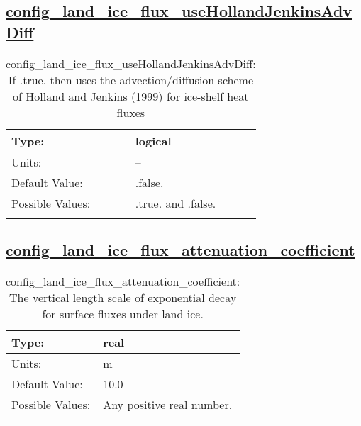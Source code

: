 \subsection[config\_land\_ice\_flux\_useHollandJenkinsAdvDiff]{\hyperref[sec:nm_tab_land_ice_fluxes]{config\_land\_ice\_flux\_useHollandJenkinsAdvDiff}}
\label{subsec:nm_sec_config_land_ice_flux_useHollandJenkinsAdvDiff}
\begin{center}
\begin{longtable}{| p{2.0in} || p{4.0in} |}
    \hline
    Type: & logical \\
    \hline
    Units: & -- \\
    \hline
    Default Value: & .false. \\
    \hline
    Possible Values: & .true. and .false. \\
    \hline
    \caption{config\_land\_ice\_flux\_useHollandJenkinsAdvDiff: If .true. then uses the advection/diffusion scheme of Holland and Jenkins (1999) for ice-shelf heat fluxes}
\end{longtable}
\end{center}
\subsection[config\_land\_ice\_flux\_attenuation\_coefficient]{\hyperref[sec:nm_tab_land_ice_fluxes]{config\_land\_ice\_flux\_attenuation\_coefficient}}
\label{subsec:nm_sec_config_land_ice_flux_attenuation_coefficient}
\begin{center}
\begin{longtable}{| p{2.0in} || p{4.0in} |}
    \hline
    Type: & real \\
    \hline
    Units: & \si{m} \\
    \hline
    Default Value: & 10.0 \\
    \hline
    Possible Values: & Any positive real number. \\
    \hline
    \caption{config\_land\_ice\_flux\_attenuation\_coefficient: The vertical length scale of exponential decay for surface fluxes under land ice.}
\end{longtable}
\end{center}
